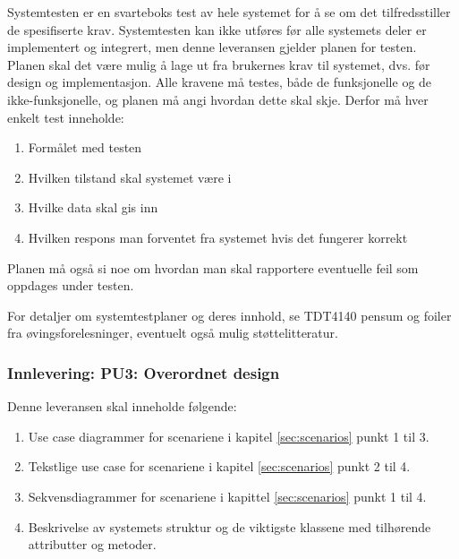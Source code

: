 Systemtesten er en svarteboks test av hele systemet for å se om det tilfredsstiller de spesifiserte krav. Systemtesten kan ikke utføres før alle systemets deler er implementert og integrert, men denne leveransen gjelder planen for testen. Planen skal det være mulig å lage ut fra brukernes krav til systemet, dvs. før design og implementasjon. Alle kravene må testes, både de funksjonelle og de ikke-funksjonelle, og planen må angi hvordan dette skal skje. Derfor må hver enkelt test inneholde:

\begin{enumerate}

\item
Formålet med testen

\item
Hvilken tilstand skal systemet være i

\item
Hvilke data skal gis inn

\item
Hvilken respons man forventet fra systemet hvis det fungerer korrekt

\end{enumerate}

Planen må også si noe om hvordan man skal rapportere eventuelle feil som oppdages under testen.

For detaljer om systemtestplaner og deres innhold, se TDT4140 pensum og foiler fra øvingsforelesninger, eventuelt også mulig støttelitteratur.

\subsubsection{Innlevering: PU3: Overordnet design}

Denne leveransen skal inneholde følgende:

\begin{enumerate}

\item
Use case diagrammer for scenariene i kapitel \ref{sec:scenarios} punkt 1 til 3.

\item
    Tekstlige use case for scenariene i kapitel \ref{sec:scenarios} punkt 2 til 4.

\item
    Sekvensdiagrammer for scenariene i kapittel \ref{sec:scenarios} punkt 1 til 4.

\item
Beskrivelse av systemets struktur og de viktigste klassene med tilhørende attributter og metoder.

\end{enumerate}

